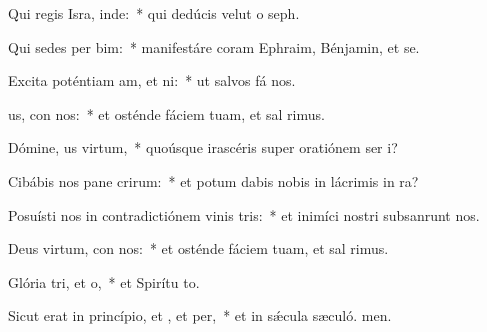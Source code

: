 \item Qui regis Isra, inde:~* qui dedúcis velut o seph.
\item Qui sedes per bim:~* manifestáre coram Ephraim, Bénjamin, et se.
\item Excita poténtiam am, et ni:~* ut salvos fá nos.
\item {}us, con nos:~* et osténde fáciem tuam, et sal rimus.
\item Dómine, us virtum,~* quoúsque irascéris super oratiónem ser i?
\item Cibábis nos pane crirum:~* et potum dabis nobis in lácrimis in ra?
\item Posuísti nos in contradictiónem vinis tris:~* et inimíci nostri subsanrunt nos.
\item Deus virtum, con nos:~* et osténde fáciem tuam, et sal rimus.
\item Glória tri, et o,~* et Spirítu to.
\item Sicut erat in princípio, et , et per,~* et in sǽcula sæculó. men.
